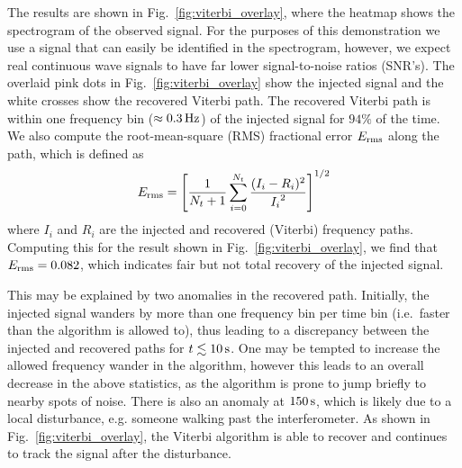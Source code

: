 \documentclass[paper-main.tex]{subfiles}
\begin{document}
The results are shown in Fig.~\ref{fig:viterbi_overlay}, where the heatmap shows the spectrogram of the observed signal. 
For the purposes of this demonstration we use a signal that can easily be identified in the spectrogram, however, we expect real continuous wave signals to have far lower signal-to-noise ratios (SNR's). 
The overlaid pink dots in Fig.~\ref{fig:viterbi_overlay} show the injected signal and the white crosses show the recovered Viterbi path.
The recovered Viterbi path is within one frequency bin ($\approx 0.3\,{\rm Hz}$) of the injected signal for $94\%$ of the time. We also compute the root-mean-square (RMS) fractional error $E_{\rm rms}$ along the path, which is defined as 
\begin{equation}
E_{\rm rms} = \left[ \frac{1}{N_t+1} \sum_{i=0}^{N_t} \frac{(I_i - R_i)^2}{{I_i}^2} \right] ^{1/2}
\end{equation}
where $I_i$ and $R_i$ are the injected and recovered (Viterbi) frequency paths. Computing this for the result shown in Fig.~\ref{fig:viterbi_overlay}, we find that $E_{\rm rms} = 0.082$, which indicates fair but not total recovery of the injected signal.


This may be explained by two anomalies in the recovered path. Initially, the injected signal wanders by more than one frequency bin per time bin (i.e.\ faster than the algorithm is allowed to), thus leading to a discrepancy between the injected and recovered paths for $t\lesssim 10\,{\rm s}$. One may be tempted to increase the allowed frequency wander in the algorithm, however this leads to an overall decrease in the above statistics, as the algorithm is prone to jump briefly to nearby spots of noise. There is also an anomaly at $150\,{\rm s}$, which is likely due to a local disturbance, e.g. someone walking past the interferometer. 
As shown in Fig.~\ref{fig:viterbi_overlay}, the Viterbi algorithm is able to recover and continues to track the signal after the disturbance. 
\end{document}
